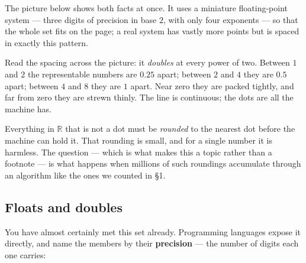 \documentclass[11pt]{article}
\theoremstyle{plain}
\theoremstyle{definition}
\theoremstyle{remark}
\newcommand{\R}{\mathbb{R}}
\newcommand{\F}{\mathbb{F}}
\begin{document}
\noindent The picture below shows both facts at once. It uses a miniature
floating-point system --- three digits of precision in base $2$, with only four
exponents --- so that the whole set fits on the page; a real system has vastly
more points but is spaced in exactly this pattern.

\begin{center}
\end{center}

\noindent Read the spacing across the picture: it \emph{doubles} at every power
of two. Between $1$ and $2$ the representable numbers are $0.25$ apart; between
$2$ and $4$ they are $0.5$ apart; between $4$ and $8$ they are $1$ apart. Near
zero they are packed tightly, and far from zero they are strewn thinly. The line
is continuous; the dots are all the machine has.

Everything in $\R$ that is not a dot must be \emph{rounded} to the nearest dot
before the machine can hold it. That rounding is small, and for a single number
it is harmless. The question --- which is what makes this a topic rather than a
footnote --- is what happens when millions of such roundings accumulate through
an algorithm like the ones we counted in \S1.

\subsection{Floats and doubles}
You have almost certainly met this set already. Programming languages expose it
directly, and name the members by their \textbf{precision} --- the number of
digits each one carries:
\end{document}
